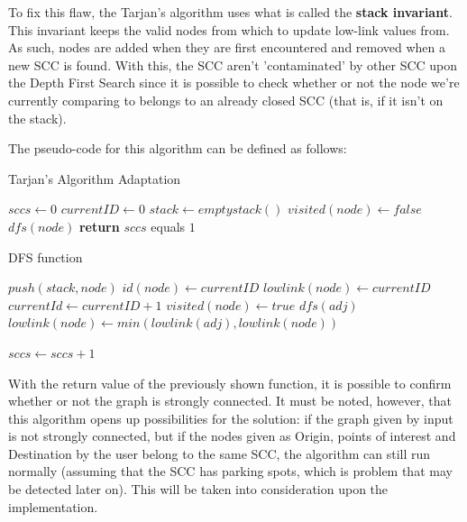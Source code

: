 \documentclass[a4paper, 12pt]{report}
\begin{document}
    To fix this flaw, the Tarjan's algorithm uses what is called the \textbf{stack invariant}. This invariant keeps the valid nodes from which to update low-link values from. As such, nodes are added when they are first encountered and removed when a new SCC is found. With this, the SCC aren't 'contaminated' by other SCC upon the Depth First Search since it is possible to check whether or not the node we're currently comparing to belongs to an already closed SCC (that is, if it isn't on the stack).
    
    The pseudo-code for this algorithm can be defined as follows:
    
    \begin{algorithm}[H]
        \label{alg:tarjan}
    	\caption{Tarjan's Algorithm Adaptation} 
	    \begin{algorithmic}[1]
	    \State $sccs \leftarrow 0$
	    \State $currentID \leftarrow 0$
	    \State $stack \leftarrow emptystack()$
	    \State
	        \State $visited(node) \leftarrow false$
	    \EndFor
	            \State $dfs(node)$
	        \EndIf
	    \EndFor
		\State \textbf{return} $sccs$ equals $1$
	    \end{algorithmic} 
    \end{algorithm}
    \begin{algorithm}[H]
    	\caption{DFS function}
    	\begin{algorithmic}[1]
	        \State $push(stack, node)$
	        \State $id(node) \leftarrow currentID$
	        \State $lowlink(node) \leftarrow currentID$
	        \State $currentId \leftarrow currentID + 1$
	        \State $visited(node) \leftarrow true$
	        \State
	                \State $dfs(adj)$
	            \EndIf
	                \State $lowlink(node) \leftarrow min(lowlink(adj), lowlink(node))$
	            \EndIf
	        \EndFor
	        
	        \State
	            \EndWhile
	            \State $sccs \leftarrow sccs + 1$
	        \EndIf
	    \end{algorithmic}
    \end{algorithm}

        
    With the return value of the previously shown function, it is possible to confirm whether or not the graph is strongly connected. It must be noted, however, that this algorithm opens up possibilities for the solution: if the graph given by input is not strongly connected, but if the nodes given as Origin, points of interest and Destination by the user belong to the same SCC, the algorithm can still run normally (assuming that the SCC has parking spots, which is problem that may be detected later on). This will be taken into consideration upon the implementation.
    
\end{document}

